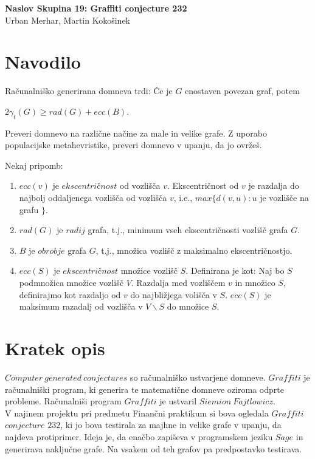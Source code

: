 \documentclass[10pt, a4paper]{article}
\begin{document}
\begin{center}
\Huge \textbf{Naslov Skupina 19: Graffiti conjecture 232} \\
\medskip
\Large Urban Merhar, Martin Kokošinek\\
\end{center}

\section{Navodilo}
Računalniško generirana domneva trdi: Če je $G$ enostaven povezan graf, potem
\begin{center}
 $2\gamma_{t}(G) \geq rad(G) + ecc(B)$.
\end{center}
 
Preveri domnevo na različne načine za male in velike grafe. Z uporabo populacijske metahevristike, preveri domnevo v upanju, da jo ovržeš.

\medskip
Nekaj pripomb:

\begin{enumerate}
\item $ecc(v)$ je $ekscentričnost$ od vozlišča $v$. Ekscentričnost od $v$ je razdalja do najbolj oddaljenega vozlišča od vozlišča $v$, i.e., $ max\{d(v,u): u$ je vozlišče na grafu $\}$.
\item $rad(G)$ je $radij$ grafa, t.j., minimum vseh ekscentričnosti vozlišč grafa $G$.
\item $B$ je $obrobje$ grafa $G$, t.j., množica vozlišč z maksimalno ekscentričnostjo.
\item $ecc(S)$ je $ekscentričnost$ množice vozlišč $S$. Definirana je kot: Naj bo $S$ podmnožica množice vozlišč $V$. Razdalja med vozliščem $v$ in množico $S$, definirajmo kot razdaljo od $v$ do najbližjega volišča v $S$. $ecc(S)$ je maksimum razadalj od vozlišča v $V\backslash S$ do množice $S$.
\end{enumerate}


\section{Kratek opis}
$Computer\ generated\ conjectures$ so računalniško ustvarjene domneve. $Graffiti$ je računalniški program, ki generira te matematične domneve oziroma odprte probleme. Računalniši program $Graffiti$ je ustvaril $Siemion\ Fajtlowicz$.\\

V najinem projektu pri predmetu Finančni praktikum si bova ogledala $Graffiti$ $conjecture$ $232$, ki jo bova testirala za majhne in velike grafe v upanju, da najdeva protiprimer. Ideja je, da enačbo zapiševa v programskem jeziku $Sage$ in generirava naključne grafe. Na vsakem od teh grafov pa predpostavko testirava.\\
\end{document}
